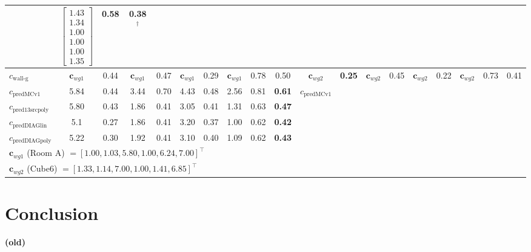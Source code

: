 \documentclass[journal]{IEEEtran}
\begin{document}
\begin{table}[tbh]
\begin{tabular}{l | cc cc cc cc c | cc cc cc cc c}
        & \multicolumn{1}{c}{$\begin{bmatrix} 1.43\\1.34\\1.00\\1.00\\1.00\\1.35 \end{bmatrix}$} & 0.58 & 0.38$^\dagger$ \\[20pt] 
        \midrule

        $c_{\text{wall-g}}$
        & $\mathbf{c}_{wg1}$ & 0.44 & $\mathbf{c}_{wg1}$ & 0.47 & $\mathbf{c}_{wg1}$ & 0.29 & $\mathbf{c}_{wg1}$ & 0.78 & 0.50
        & $\mathbf{c}_{wg2}$ & \textbf{0.25} & $\mathbf{c}_{wg2}$ & 0.45 & $\mathbf{c}_{wg2}$ & 0.22 & $\mathbf{c}_{wg2}$ & 0.73 & 0.41 \\
        \midrule
           $c_{\text{predMCv1}}$
        & 5.84 & 0.44
            & 3.44 & 0.70
              & 4.43 & 0.48
              & 2.56 & 0.81
               & \textbf{0.61}  
        & $c_{\text{predMCv1}}$ & & & & & & & & \\[2pt]

        $c_{\text{pred13srcpoly}}$
        & 5.80 & 0.43 & 1.86 & 0.41 & 3.05 & 0.41 & 1.31 & 0.63 &  \textbf{0.47}  
        &  &  &  &  &  &  &  &  & \\[2pt]

        $c_{\text{predDIAGlin}}$
        & 5.1 & 0.27 & 1.86 & 0.41 & 3.20 & 0.37 & 1.00 & 0.62 &  \textbf{0.42}  
        &  &  &  &  &  &  &  &  & \\[2pt]

        $c_{\text{predDIAGpoly}}$
        & 5.22 & 0.30 & 1.92 & 0.41 & 3.10 & 0.40 & 1.09 & 0.62 &  \textbf{0.43}  
        &  &  &  &  &  &  &  &  & \\[2pt]
        
        \bottomrule
        \multicolumn{19}{l}{\footnotesize  * $\mathbf{c}_{wg1}$ (Room A) $= [1.00, 1.03, 5.80, 1.00, 6.24, 7.00]^\top$} \\
        \multicolumn{19}{l}{\footnotesize  * $\mathbf{c}_{wg2}$ (Cube6) $= [1.33, 1.14, 7.00, 1.00, 1.41, 6.85]^\top$} \\
    \end{tabular}
\end{table}

\section{Conclusion}
\label{sec:conclusion}
\textbf{(old)}
\end{document}

